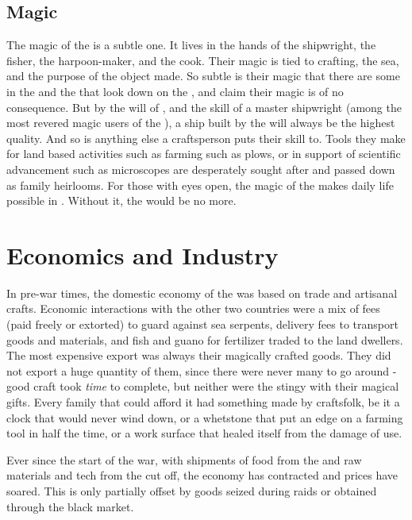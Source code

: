 \documentclass[blue]{GL2020}
\begin{document}
\subsection*{Magic}
The magic of the \pShip{} is a subtle one. It lives in the hands of the shipwright, the fisher, the harpoon-maker, and the cook. Their magic is tied to crafting, the sea, and the purpose of the object made. So subtle is their magic that there are some in the \pFarm{} and the \pTech{} that look down on the \pShippies{}, and claim their magic is of no consequence. But by the will of \cEbb{\full}, and the skill of a master shipwright (among the most revered magic users of the \pShippies{}), a ship built by the \pShippies{} will always be the highest quality. And so is anything else a \pShippie{} craftsperson puts their skill to. Tools they make for land based activities such as farming such as plows, or in support of scientific advancement such as microscopes are desperately sought after and passed down as family heirlooms. For those with eyes open, the magic of the \pShippies{} makes daily life possible in \pEarth{}. Without it, the \pShippies{} would be no more.

\section*{Economics and Industry}
In pre-war times, the domestic economy of the \pShip{} was based on trade and artisanal crafts. Economic interactions with the other two countries were a mix of fees (paid freely or extorted) to guard against sea serpents, delivery fees to transport goods and materials, and fish and guano for fertilizer traded to the land dwellers. The \pShippies{} most expensive export was always their magically crafted goods. They did not export a huge quantity of them, since there were never many to go around - good craft took \emph{time} to complete, but neither were the \pShippies{} stingy with their magical gifts. Every family that could afford it had something made by \pShippie{} craftsfolk, be it a clock that would never wind down, or a whetstone that put an edge on a farming tool in half the time, or a work surface that healed itself from the damage of use.

Ever since the start of the war, with shipments of food from the \pFarm{}and raw materials and tech from the \pTech{}cut off, the \pShippie{}economy has contracted and prices have soared. This is only partially offset by goods seized during raids or obtained through the black market.
\end{document}
